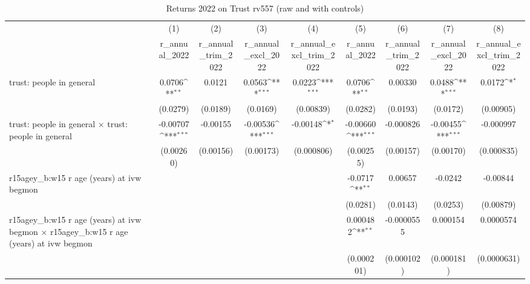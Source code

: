 \begin{table}[htbp]\centering
\def\sym#1{\ifmmode^{#1}\else\(^{#1}\)\fi}
\caption{Returns 2022 on Trust rv557 (raw and with controls)}
\begin{tabular}{l*{8}{c}}
\toprule
                &\multicolumn{1}{c}{(1)}&\multicolumn{1}{c}{(2)}&\multicolumn{1}{c}{(3)}&\multicolumn{1}{c}{(4)}&\multicolumn{1}{c}{(5)}&\multicolumn{1}{c}{(6)}&\multicolumn{1}{c}{(7)}&\multicolumn{1}{c}{(8)}\\
                &\multicolumn{1}{c}{r\_annual\_2022}&\multicolumn{1}{c}{r\_annual\_trim\_2022}&\multicolumn{1}{c}{r\_annual\_excl\_2022}&\multicolumn{1}{c}{r\_annual\_excl\_trim\_2022}&\multicolumn{1}{c}{r\_annual\_2022}&\multicolumn{1}{c}{r\_annual\_trim\_2022}&\multicolumn{1}{c}{r\_annual\_excl\_2022}&\multicolumn{1}{c}{r\_annual\_excl\_trim\_2022}\\
\midrule
trust: people in general&   0.0706\sym{**} &   0.0121         &   0.0563\sym{***}&   0.0223\sym{***}&   0.0706\sym{**} &  0.00330         &   0.0488\sym{***}&   0.0172\sym{*}  \\
                & (0.0279)         & (0.0189)         & (0.0169)         &(0.00839)         & (0.0282)         & (0.0193)         & (0.0172)         &(0.00905)         \\
\addlinespace
trust: people in general $\times$ trust: people in general& -0.00707\sym{***}& -0.00155         & -0.00536\sym{***}& -0.00148\sym{*}  & -0.00660\sym{***}&-0.000826         & -0.00455\sym{***}&-0.000997         \\
                &(0.00260)         &(0.00156)         &(0.00173)         &(0.000806)         &(0.00255)         &(0.00157)         &(0.00170)         &(0.000835)         \\
\addlinespace
r15agey\_b:w15 r age (years) at ivw begmon&                  &                  &                  &                  &  -0.0717\sym{**} &  0.00657         &  -0.0242         & -0.00844         \\
                &                  &                  &                  &                  & (0.0281)         & (0.0143)         & (0.0253)         &(0.00879)         \\
\addlinespace
r15agey\_b:w15 r age (years) at ivw begmon $\times$ r15agey\_b:w15 r age (years) at ivw begmon&                  &                  &                  &                  & 0.000482\sym{**} &-0.0000555         & 0.000154         &0.0000574         \\
                &                  &                  &                  &                  &(0.000201)         &(0.000102)         &(0.000181)         &(0.0000631)         \\

\end{tabular}
\end{table}
